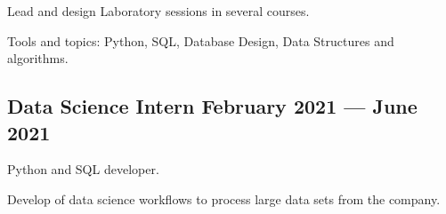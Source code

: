 \documentclass[letter,10pt]{article}
\begin{document}
\begin{zitemize}
\item Lead and design Laboratory sessions in several courses. 
\item Tools and topics: Python, SQL, Database Design, Data Structures and algorithms.
\end{zitemize}

\subsection{{Data Science Intern 
\hfill February 2021 --- June 2021}}
\begin{zitemize}
\item Python and SQL developer.
\item Develop of data science workflows to process large data sets from the company.
\end{zitemize}

\end{document}
